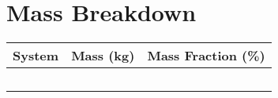 \section{Mass Breakdown}

\begin{center}
\begin{tabular}{l c c}
System & Mass (kg) & Mass Fraction (\%)\\
\hline
\

\end{tabular}
\end{center}